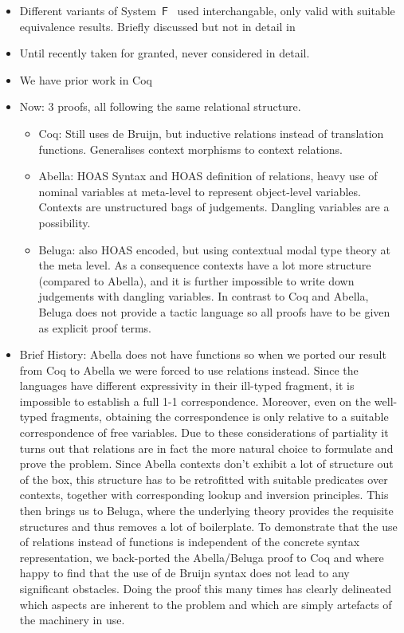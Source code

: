 \documentclass[a4paper,UKenglish]{lipics-v2016}
\newcommand{\SysF}{\ensuremath{\mathsf{F}}\xspace}
\begin{document}
\begin{itemize}
\item Different variants of System~\SysF~\cite{Girard1972, DBLP:conf/programm/Reynolds74} used interchangable, only valid with suitable equivalence results.
  Briefly discussed but not in detail in~\cite{Geuvers1993}
\item Until recently taken for granted, never considered in detail.
\item We have prior work in Coq \cite{KaiserEtAl:2017:sysf_pts_equiv_coq}
\item Now: 3 proofs, all following the same relational structure.
  \begin{itemize}
  \item Coq: Still uses de Bruijn, but inductive relations instead of translation functions.
    Generalises context morphisms to context relations.
  \item Abella: HOAS Syntax and HOAS definition of relations, heavy use of nominal variables at meta-level to represent object-level variables.
    Contexts are unstructured bags of judgements.
    Dangling variables are a possibility.
  \item Beluga: also HOAS encoded, but using contextual modal type theory at the meta level.
    As a consequence contexts have a lot more structure (compared to Abella), and it is further impossible to write down judgements with dangling variables.
    In contrast to Coq and Abella, Beluga does not provide a tactic language so all proofs have to be given as explicit proof terms.
  \end{itemize}
\item Brief History: Abella does not have functions so when we ported our result from Coq to Abella we were forced to use relations instead.
  Since the languages have different expressivity in their ill-typed fragment, it is impossible to establish a full 1-1 correspondence.
  Moreover, even on the well-typed fragments, obtaining the correspondence is only relative to a suitable correspondence of free variables.
  Due to these considerations of partiality it turns out that relations are in fact the more natural choice to formulate and prove the problem.
  Since Abella contexts don't exhibit a lot of structure out of the box, this structure has to be retrofitted with suitable predicates over contexts, together with corresponding lookup and inversion principles.
  This then brings us to Beluga, where the underlying theory provides the requisite structures and thus removes a lot of boilerplate.
  To demonstrate that the use of relations instead of functions is independent of the concrete syntax representation, we back-ported the Abella/Beluga proof to Coq and where happy to find that the use of de Bruijn syntax does not lead to any significant obstacles.
  Doing the proof this many times has clearly delineated which aspects are inherent to the problem and which are simply artefacts of the machinery in use.
\end{itemize}
\end{document}
